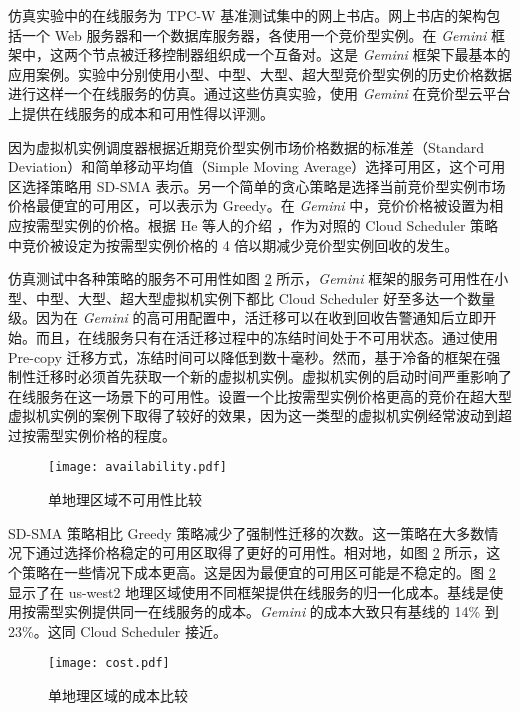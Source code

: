 仿真实验中的在线服务为 TPC-W 基准测试集中的网上书店。网上书店的架构包括一个 Web 服务器和一个数据库服务器，各使用一个竞价型实例。在 \emph{Gemini} 框架中，这两个节点被迁移控制器组织成一个互备对。这是 \emph{Gemini} 框架下最基本的应用案例。实验中分别使用小型、中型、大型、超大型竞价型实例的历史价格数据进行这样一个在线服务的仿真。通过这些仿真实验，使用 \emph{Gemini} 在竞价型云平台上提供在线服务的成本和可用性得以评测。

因为虚拟机实例调度器根据近期竞价型实例市场价格数据的标准差（Standard Deviation）和简单移动平均值（Simple Moving Average）选择可用区，这个可用区选择策略用 SD-SMA 表示。另一个简单的贪心策略是选择当前竞价型实例市场价格最便宜的可用区，可以表示为 Greedy。在 \emph{Gemini} 中，竞价价格被设置为相应按需型实例的价格。根据 He 等人的介绍 \cite{He:2015:CCH:2749246.2749275}，作为对照的 Cloud Scheduler 策略中竞价被设定为按需型实例价格的 4 倍以期减少竞价型实例回收的发生。

仿真测试中各种策略的服务不可用性如图 \ref{figure:cost} 所示，\emph{Gemini} 框架的服务可用性在小型、中型、大型、超大型虚拟机实例下都比 Cloud Scheduler 好至多达一个数量级。因为在 \emph{Gemini} 的高可用配置中，活迁移可以在收到回收告警通知后立即开始。而且，在线服务只有在活迁移过程中的冻结时间处于不可用状态。通过使用 Pre-copy 迁移方式，冻结时间可以降低到数十毫秒。然而，基于冷备的框架在强制性迁移时必须首先获取一个新的虚拟机实例。虚拟机实例的启动时间严重影响了在线服务在这一场景下的可用性。设置一个比按需型实例价格更高的竞价在超大型虚拟机实例的案例下取得了较好的效果，因为这一类型的虚拟机实例经常波动到超过按需型实例价格的程度。
\begin{figure}[]
  \centering
  \texttt{[image: availability.pdf]}
  \caption{单地理区域不可用性比较}
  \label{figure:unavailability}
\end{figure}

SD-SMA 策略相比 Greedy 策略减少了强制性迁移的次数。这一策略在大多数情况下通过选择价格稳定的可用区取得了更好的可用性。相对地，如图 \ref{figure:cost} 所示，这个策略在一些情况下成本更高。这是因为最便宜的可用区可能是不稳定的。图 \ref{figure:cost} 显示了在 us-west2 地理区域使用不同框架提供在线服务的归一化成本。基线是使用按需型实例提供同一在线服务的成本。\emph{Gemini} 的成本大致只有基线的 14\% 到 23\%。这同 Cloud Scheduler 接近。
\begin{figure}[]
  \centering
  \texttt{[image: cost.pdf]}
  \caption{单地理区域的成本比较}
  \label{figure:cost}
\end{figure}

